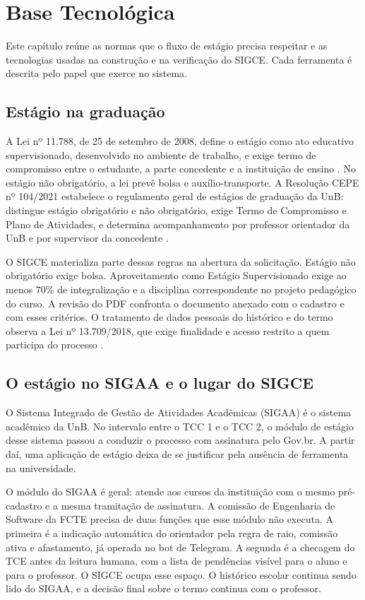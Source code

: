 \chapter{Base Tecnológica}

Este capítulo reúne as normas que o fluxo de estágio precisa respeitar e as tecnologias usadas na construção e na verificação do SIGCE. Cada ferramenta é descrita pelo papel que exerce no sistema.

\section{Estágio na graduação}

A Lei nº 11.788, de 25 de setembro de 2008, define o estágio como ato educativo supervisionado, desenvolvido no ambiente de trabalho, e exige termo de compromisso entre o estudante, a parte concedente e a instituição de ensino \cite{lei11788}. No estágio não obrigatório, a lei prevê bolsa e auxílio-transporte. A Resolução CEPE nº 104/2021 estabelece o regulamento geral de estágios de graduação da UnB: distingue estágio obrigatório e não obrigatório, exige Termo de Compromisso e Plano de Atividades, e determina acompanhamento por professor orientador da UnB e por supervisor da concedente \cite{cepe1042021}.

O SIGCE materializa parte dessas regras na abertura da solicitação. Estágio não obrigatório exige bolsa. Aproveitamento como Estágio Supervisionado exige ao menos 70\% de integralização e a disciplina correspondente no projeto pedagógico do curso. A revisão do PDF confronta o documento anexado com o cadastro e com esses critérios. O tratamento de dados pessoais do histórico e do termo observa a Lei nº 13.709/2018, que exige finalidade e acesso restrito a quem participa do processo \cite{lgpd2018}.

\section{O estágio no SIGAA e o lugar do SIGCE}

O Sistema Integrado de Gestão de Atividades Acadêmicas (SIGAA) é o sistema acadêmico da UnB. No intervalo entre o TCC 1 e o TCC 2, o módulo de estágio desse sistema passou a conduzir o processo com assinatura pelo Gov.br. A partir daí, uma aplicação de estágio deixa de se justificar pela ausência de ferramenta na universidade.

O módulo do SIGAA é geral: atende aos cursos da instituição com o mesmo pré-cadastro e a mesma tramitação de assinatura. A comissão de Engenharia de Software da FCTE precisa de duas funções que esse módulo não executa. A primeira é a indicação automática do orientador pela regra de raio, comissão ativa e afastamento, já operada no bot de Telegram. A segunda é a checagem do TCE antes da leitura humana, com a lista de pendências visível para o aluno e para o professor. O SIGCE ocupa esse espaço. O histórico escolar continua sendo lido do SIGAA, e a decisão final sobre o termo continua com o professor.

